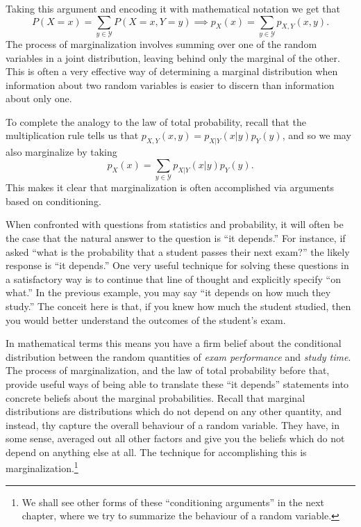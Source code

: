 \documentclass[
  letterpaper,
  DIV=11,
  numbers=noendperiod]{scrreprt}
\theoremstyle{definition}
\theoremstyle{definition}
\theoremstyle{definition}
\theoremstyle{remark}
\begin{document}
\begin{tcolorbox}
\begin{figure}[H]
{}

\end{figure}%

Taking this argument and encoding it with mathematical notation we get
that
\[P(X=x) = \sum_{y\in\mathcal{Y}} P(X=x, Y=y) \implies p_X(x) = \sum_{y\in\mathcal{Y}} p_{X,Y}(x,y).\]
The process of marginalization involves summing over one of the random
variables in a joint distribution, leaving behind only the marginal of
the other. This is often a very effective way of determining a marginal
distribution when information about two random variables is easier to
discern than information about only one.

To complete the analogy to the law of total probability, recall that the
multiplication rule tells us that \(p_{X,Y}(x,y) = p_{X|Y}(x|y)p_Y(y)\),
and so we may also marginalize by taking
\[p_X(x) = \sum_{y\in\mathcal{Y}} p_{X|Y}(x|y)p_Y(y).\] This makes it
clear that marginalization is often accomplished via arguments based on
conditioning.

\end{tcolorbox}

When confronted with questions from statistics and probability, it will
often be the case that the natural answer to the question is ``it
depends.'' For instance, if asked ``what is the probability that a
student passes their next exam?'' the likely response is ``it depends.''
One very useful technique for solving these questions in a satisfactory
way is to continue that line of thought and explicitly specify ``on
what.'' In the previous example, you may say ``it depends on how much
they study.'' The conceit here is that, if you knew how much the student
studied, then you would better understand the outcomes of the student's
exam.

In mathematical terms this means you have a firm belief about the
conditional distribution between the random quantities of \emph{exam
performance} and \emph{study time}. The process of marginalization, and
the law of total probability before that, provide useful ways of being
able to translate these ``it depends'' statements into concrete beliefs
about the marginal probabilities. Recall that marginal distributions are
distributions which do not depend on any other quantity, and instead,
thy capture the overall behaviour of a random variable. They have, in
some sense, averaged out all other factors and give you the beliefs
which do not depend on anything else at all. The technique for
accomplishing this is marginalization.\footnote{We shall see other forms
  of these ``conditioning arguments'' in the next chapter, where we try
  to summarize the behaviour of a random variable.}
\end{document}
